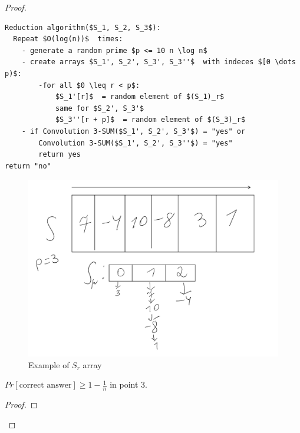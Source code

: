 \begin{proof}
\begin{enumerate}
	  \begin{lstlisting}
Reduction algorithm($S_1, S_2, S_3$):
  Repeat $O(log(n))$  times:
	- generate a random prime $p <= 10 n \log n$
	- create arrays $S_1', S_2', S_3', S_3''$  with indeces $[0 \dots p)$:
		-for all $0 \leq r < p$:
			$S_1'[r]$  = random element of $(S_1)_r$
			same for $S_2', S_3'$
			$S_3''[r + p]$  = random element of $(S_3)_r$
	- if Convolution 3-SUM($S_1', S_2', S_3'$) = "yes" or
		Convolution 3-SUM($S_1', S_2', S_3''$) = "yes"
		return yes
return "no"
	  \end{lstlisting}

  \end{enumerate}

  \begin{figure}[ht]
	\center
	\includegraphics[scale=0.3]{figures/2.pdf}
	\caption{Example of $S_r$ array}
  \end{figure}


  \begin{thm}
	$Pr[\text{correct answer}] \geq 1 - \frac{1}{n}$ in point 3.
  \end{thm}
  \begin{proof}


\end{proof}
\end{proof}
